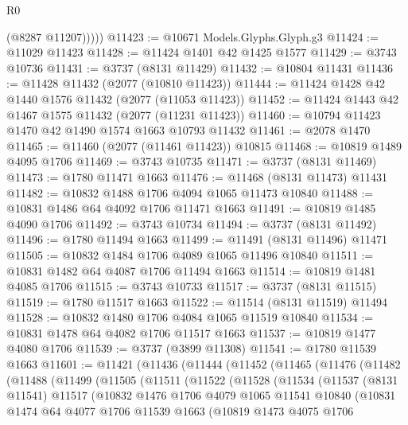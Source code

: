 \begin{lexlean}{R0}
\begin{coremodule}
            (@8287 @11207)))))
@11423 := @10671 Models.Glyphs.Glyph.g3
@11424 := @11029 @11423
@11428 := @11424 @1401 @42 @1425 @1577
@11429 := @3743 @10736
@11431 := @3737 (@8131 @11429)
@11432 := @10804 @11431
@11436 := @11428 @11432 (@2077 (@10810 @11423))
@11444 := @11424 @1428 @42 @1440 @1576 @11432 (@2077 (@11053 @11423))
@11452 := @11424 @1443 @42 @1467 @1575 @11432 (@2077 (@11231 @11423))
@11460 := @10794 @11423 @1470 @42 @1490 @1574 @1663 @10793 @11432
@11461 := @2078 @1470
@11465 := @11460 (@2077 (@11461 @11423)) @10815
@11468 := @10819 @1489 @4095 @1706
@11469 := @3743 @10735
@11471 := @3737 (@8131 @11469)
@11473 := @1780 @11471 @1663
@11476 := @11468 (@8131 @11473) @11431
@11482 := @10832 @1488 @1706 @4094 @1065 @11473 @10840
@11488 := @10831 @1486 @64 @4092 @1706 @11471 @1663
@11491 := @10819 @1485 @4090 @1706
@11492 := @3743 @10734
@11494 := @3737 (@8131 @11492)
@11496 := @1780 @11494 @1663
@11499 := @11491 (@8131 @11496) @11471
@11505 := @10832 @1484 @1706 @4089 @1065 @11496 @10840
@11511 := @10831 @1482 @64 @4087 @1706 @11494 @1663
@11514 := @10819 @1481 @4085 @1706
@11515 := @3743 @10733
@11517 := @3737 (@8131 @11515)
@11519 := @1780 @11517 @1663
@11522 := @11514 (@8131 @11519) @11494
@11528 := @10832 @1480 @1706 @4084 @1065 @11519 @10840
@11534 := @10831 @1478 @64 @4082 @1706 @11517 @1663
@11537 := @10819 @1477 @4080 @1706
@11539 := @3737 (@3899 @11308)
@11541 := @1780 @11539 @1663
@11601 := @11421
    (@11436
      (@11444
        (@11452
          (@11465
            (@11476
              (@11482
                (@11488
                  (@11499
                    (@11505
                      (@11511
                        (@11522
                          (@11528
                            (@11534
                              (@11537
                                (@8131 @11541)
                                @11517
                                (@10832
                                  @1476
                                  @1706
                                  @4079
                                  @1065
                                  @11541
                                  @10840
                                  (@10831
                                    @1474
                                    @64
                                    @4077
                                    @1706
                                    @11539
                                    @1663
                                    (@10819
                                      @1473
                                      @4075
                                      @1706

\end{coremodule}
\end{lexlean}
